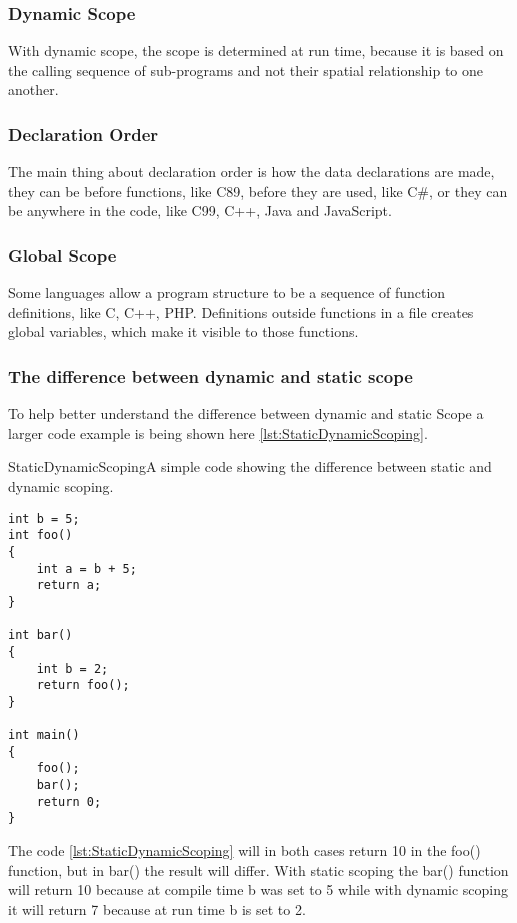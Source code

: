 \subsubsection{Dynamic Scope}
With dynamic scope, the scope is determined at run time, because it is based on the calling sequence of sub-programs and not their spatial relationship to one another.

\subsubsection{Declaration Order}
The main thing about declaration order is how the data declarations are made, they can be before functions, like C89, before they are used, like C\#, or they can be anywhere in the code, like C99, C++, Java and JavaScript.

\subsubsection{Global Scope}
Some languages allow a program structure to be a sequence of function definitions, like C, C++, PHP. Definitions outside functions in a file creates global variables, which make it visible to those functions.

\subsubsection{The difference between dynamic and static scope}
To help better understand the difference between dynamic and static Scope a larger code example is being shown here \ref{lst:StaticDynamicScoping}.
\begin{code}{StaticDynamicScoping}{A simple code showing the difference between static and dynamic scoping. \citep{StaticvsDynamic}}
\begin{lstlisting}
int b = 5;
int foo()
{
	int a = b + 5;
	return a;
}

int bar()
{
	int b = 2;
	return foo();
}

int main()
{
	foo();
	bar();
	return 0;
}
\end{lstlisting}
\end{code}
The code \ref{lst:StaticDynamicScoping} will in both cases return 10 in the foo() function, but in bar() the result will differ. With static scoping the bar() function will return 10 because at compile time b was set to 5 while with dynamic scoping it will return 7 because at run time b is set to 2.

